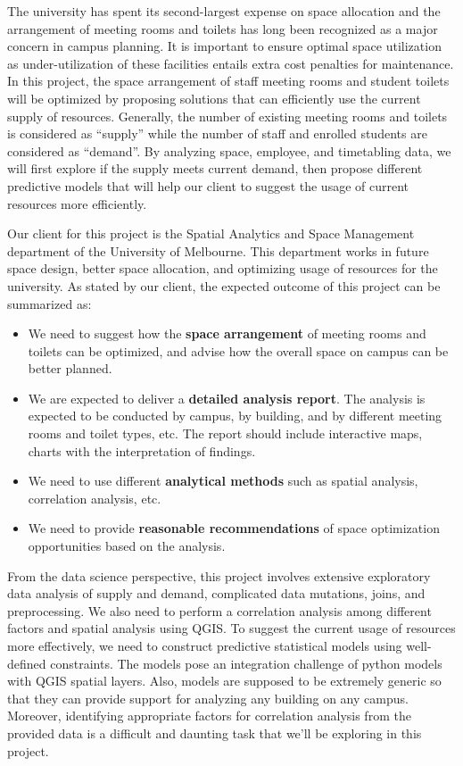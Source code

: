 The university has spent its second-largest expense on space allocation and the arrangement of meeting rooms and toilets has long been recognized as a major concern in campus planning. It is important to ensure optimal space utilization as under-utilization of these facilities entails extra cost penalties for maintenance. In this project, the space arrangement of staff meeting rooms and student toilets will be optimized by proposing solutions that can efficiently use the current supply of resources. Generally, the number of existing meeting rooms and toilets is considered as “supply” while the number of staff and enrolled students are considered as “demand”. By analyzing space, employee, and timetabling data, we will first explore if the supply meets current demand, then propose different predictive models that will help our client to suggest the usage of current resources more efficiently.

Our client for this project is the Spatial Analytics and Space Management department of the University of Melbourne. This department works in future space design, better space allocation, and optimizing usage of resources for the university. As stated by our client, the expected outcome of this project can be summarized as:
\vspace{-2mm}
\begin{itemize}
    \item We need to suggest how the \textbf{space arrangement} of meeting rooms and toilets can be optimized, and advise how the overall space on campus can be better planned.
    \vspace{-2mm}
    \item We are expected to deliver a \textbf{detailed analysis report}. The analysis is expected to be conducted by campus, by building, and by different meeting rooms and toilet types, etc. The report should include interactive maps, charts with the interpretation of findings.
    \vspace{-2mm}
    \item We need to use different \textbf{analytical methods} such as spatial analysis, correlation analysis, etc.
    \vspace{-10mm}
    \item We need to provide \textbf{reasonable recommendations} of space optimization opportunities based on the analysis.
\end{itemize}
\vspace{-2mm}

From the data science perspective, this project involves extensive exploratory data analysis of supply and demand, complicated data mutations, joins, and preprocessing. We also need to perform a correlation analysis among different factors and spatial analysis using QGIS. To suggest the current usage of resources more effectively, we need to construct predictive statistical models using well-defined constraints. The models pose an integration challenge of python models with QGIS spatial layers. Also, models are supposed to be extremely generic so that they can provide support for analyzing any building on any campus. Moreover, identifying appropriate factors for correlation analysis from the provided data is a difficult and daunting task that we'll be exploring in this project.

